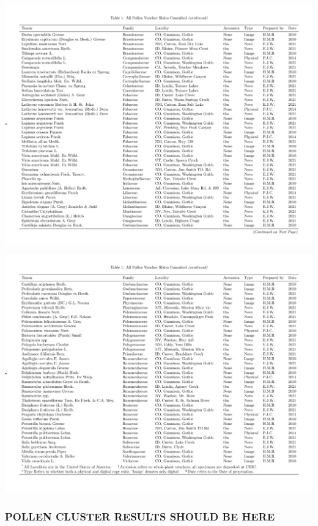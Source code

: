 \documentclass[
]{article}
\begin{document}
\newpage

\includegraphics{../graphics/assorted/pollen_slide_table_reduced-2.pdf}

\newpage

\includegraphics{../graphics/assorted/pollen_slide_table_reduced-3.pdf}

\newpage

\hypertarget{pollen-cluster-results-should-be-here}{%
\subsubsection{POLLEN CLUSTER RESULTS SHOULD BE
HERE}\label{pollen-cluster-results-should-be-here}}
\end{document}

